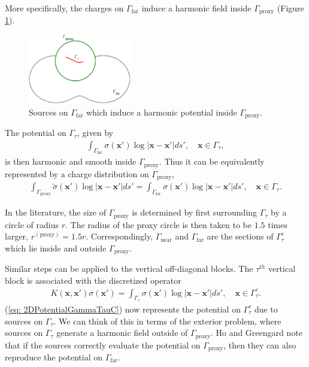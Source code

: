 \documentclass{sfuthesis}
\begin{document}
More specifically, the charges on $\Gamma_{\text{far}}$ induce a harmonic field inside $\Gamma_{\text{proxy}}$ (Figure \ref{fig: 2DGammaTauFarProxy}). 
\begin{figure}[h]
 	\centering
    	\includegraphics[width=0.4\textwidth]{2DGammaTauFarProxy}
    	\caption{Sources on $\Gamma_{\text{far}}$ which induce a harmonic potential inside $\Gamma_{\text{proxy}}$.}
	\label{fig: 2DGammaTauFarProxy}
\end{figure}
The potential on $\Gamma_\tau$, given by 
\begin{align*}
	\int_{\Gamma_{\text{far}}} \sigma(\mathbf{x}') \log |\mathbf{x}-\mathbf{x}'| ds', \quad \mathbf{x}\in \Gamma_\tau, 
\end{align*}
is then harmonic and smooth inside $\Gamma_{\text{proxy}}$. Thus it can be equivalently represented by a charge distribution on $\Gamma_{\text{proxy}}$, 
\begin{align}
	\int_{\Gamma_{\text{proxy}}} \widetilde{\sigma}(\mathbf{x}') \log |\mathbf{x}-\mathbf{x}'| ds' = \int_{\Gamma_{\text{far}}} \sigma(\mathbf{x}') \log |\mathbf{x}-\mathbf{x}'| ds',  \quad \mathbf{x}\in \Gamma_\tau \label{eq: 2DPotentialProxy}. 
\end{align}

In the literature, the size of $\Gamma_{\text{proxy}}$ is determined by first surrounding $\Gamma_\tau$ by a circle of radius $r$. The radius of the proxy circle is then taken to be $1.5$ times larger, $r^{(\text{proxy})}=1.5r$. Correspondingly, $\Gamma_\text{near}$ and $\Gamma_\text{far}$ are the sections of $\Gamma_\tau^c$ which lie inside and outside $\Gamma_{\text{proxy}}$.

Similar steps can be applied to the vertical off-diagonal blocks. The $\tau^{th}$ vertical block is associated with the discretized operator 
\begin{align}
	K(\mathbf{x}, \mathbf{x}')\sigma(\mathbf{x}')=\int_{\Gamma_\tau} \sigma(\mathbf{x}') \log|\mathbf{x}-\mathbf{x}'|ds', \quad \mathbf{x}\in \Gamma_\tau^c. \label{eq: 2DPotentialGammaTauC} 
\end{align}
(\ref{eq: 2DPotentialGammaTauC}) now represents the potential on $\Gamma_\tau^c$ due to sources on $\Gamma_\tau$. We can think of this in terms of the exterior problem, where sources on $\Gamma_\tau$ generate a harmonic field outside of $\Gamma_{\text{proxy}}$. Ho and Greengard \cite{HoGreen2012} note that if the sources correctly evaluate the potential on $\Gamma_{\text{proxy}}$, then they can also reproduce the potential on $\Gamma_{\text{far}}$. 
\end{document}
